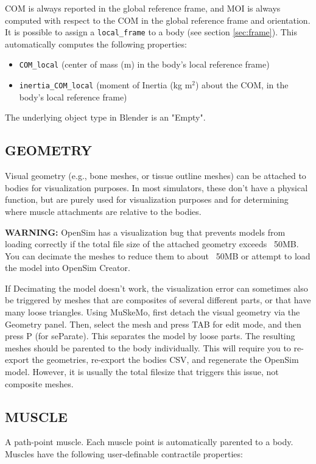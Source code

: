 \documentclass{article}
\begin{document}
COM is always reported in the global reference frame, and MOI is always computed with respect to the COM in the global reference frame and orientation. It is possible to assign a \texttt{local\_frame} to a body (see section \ref{sec:frame}). This automatically computes the following properties:


\begin{itemize}
    \item \texttt{COM\_local} (center of mass (m) in the body's local reference frame)
    \item \texttt{inertia\_COM\_local} (moment of Inertia (kg m\(^2\)) about the COM, in the body's local reference frame)
\end{itemize}

The underlying object type in Blender is an "Empty".

\subsection{GEOMETRY}

Visual geometry (e.g., bone meshes, or tissue outline meshes) can be attached to bodies for visualization purposes. In most simulators, these don’t have a physical function, but are purely used for visualization purposes and for determining where muscle attachments are relative to the bodies. 

\textbf{WARNING:} OpenSim has a visualization bug that prevents models from loading correctly if the total file size of the attached geometry exceeds ~50MB. You can decimate the meshes to reduce them to about ~50MB or attempt to load the model into OpenSim Creator.

If Decimating the model doesn't work, the visualization error can sometimes also be triggered by meshes that are composites of several different parts, or that have many loose triangles. Using MuSkeMo, first detach the visual geometry via the Geometry panel. Then, select the mesh and press TAB for edit mode, and then press P (for seParate). This separates the model by loose parts. The resulting meshes should be  parented to the body individually. 
This will require you to re-export the geometries, re-export the bodies CSV, and regenerate the OpenSim model. However, it is usually the total filesize that triggers this issue, not composite meshes.

\subsection{MUSCLE}
\label{sec:muscle}
A path-point muscle. Each muscle point is automatically parented to a body. Muscles have the following user-definable contractile properties:
\end{document}
